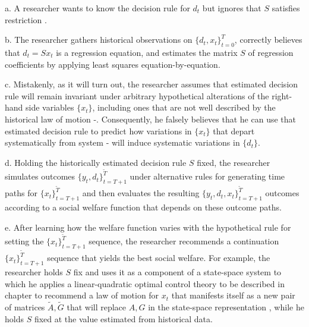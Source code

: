 \medskip

\item{a.}  A researcher   wants to know    the decision rule for $d_t$  but  ignores that   
 $S$ satisfies restriction .

\medskip

\item{b.}  The researcher gathers   historical observations on $\{d_t, x_t\}_{t=0}^T$,
 correctly believes that $d_t = S x_t$ is a
regression equation, and   estimates the matrix  $S$ of regression coefficients by applying  least squares  equation-by-equation.

\medskip

\item{c.}  Mistakenly, as it will turn out, the researcher  assumes that  estimated   decision rule %
 will remain  invariant under
 arbitrary hypothetical alterations  of the right-hand side variables $\{x_t\}$, including ones that  
 are not well   described by the historical law of motion
 -.   Consequently, he falsely believes that he can use that estimated  decision rule to predict how variations in $\{x_t\}$ that  depart  systematically from system  -
  will induce
  systematic variations in  
  $\{d_t\}$.

\medskip

\item{d.} Holding the historically estimated decision rule $S $ fixed,
 the researcher simulates outcomes $\{y_t, d_t\}_{t=T+1}^{\tilde T}$
under alternative rules for generating
 time paths  for
 $\{x_t\}_{t=T+1}^{\tilde T}$ and then evaluates the
resulting $\{y_t, d_t, x_t\}_{t=T+1}^{\tilde T}$
outcomes according to a social  welfare function that depends on these outcome paths.   %


\medskip

\item{e.} After
learning how the  welfare function varies with the hypothetical rule for setting the $\{x_t\}_{t=T+1}^{\tilde T}$ sequence,
the researcher recommends  a continuation $\{x_t\}_{t=T+1}^{\tilde T}$
sequence that yields the best social welfare. For example, the researcher holds $S$ fix and uses it as a component
of a state-space system to which he applies a linear-quadratic optimal control theory to be described in chapter  to  recommend a
law of motion for $x_t$ that manifests itself as a new pair of matrices $\tilde A, \tilde G$  that 
will replace $A, G$ in the state-space representation , while he holds $S$ fixed at the value estimated from historical data.

